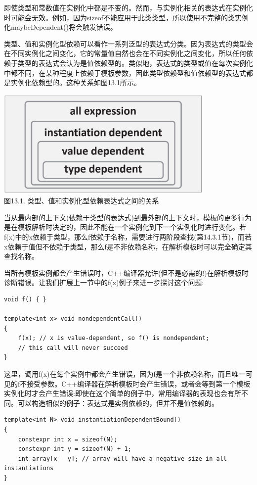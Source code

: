 即使类型和常数值在实例化中都是不变的。然而，与实例化相关的表达式在实例化时可能会无效。例如，因为sizeof不能应用于此类类型，所以使用不完整的类实例化maybeDependent()将会触发错误。

类型、值和实例化型依赖可以看作一系列泛型的表达式分类。因为表达式的类型会在不同实例化之间变化，它的常量值自然也会在不同实例化之间变化，所以任何依赖于类型的表达式会认为是值依赖型的。类似地，表达式的类型或值在每次实例化中都不同，在某种程度上依赖于模板参数，因此类型依赖型和值依赖型的表达式都是实例化依赖型的。这种关系如图13.1所示。

\begin{center}
\includegraphics[width=0.8\textwidth]{content/2/chapter13/images/1.png} \\
图13.1. 类型、值和实例化型依赖表达式之间的关系
\end{center}

当从最内部的上下文(依赖于类型的表达式)到最外部的上下文时，模板的更多行为是在模板解析时决定的，因此不能在一个实例化到下一个实例化时进行变化。若f(x)中的x依赖于类型，那么f依赖于名称，需要进行两阶段查找(第14.3.1节)，而若x依赖于值但不依赖于类型，那么f是不非依赖名称，在解析模板时可以完全确定其查找名称。


当所有模板实例都会产生错误时，C++编译器允许(但不是必需的!)在解析模板时诊断错误。让我们扩展上一节中的f(x)例子来进一步探讨这个问题:

\begin{lstlisting}[style=styleCXX]
void f() { }

template<int x> void nondependentCall()
{
	f(x); // x is value-dependent, so f() is nondependent;
	// this call will never succeed
}
\end{lstlisting}

这里，调用f(x)在每个实例中都会产生错误，因为f是一个非依赖名称，而且唯一可见的f不接受参数。C++编译器在解析模板时会产生错误，或者会等到第一个模板实例化时才会产生错误:即使在这个简单的例子中，常用编译器的表现也会有所不同。可以构造相似的例子：表达式是实例依赖的，但并不是值依赖的。

\begin{lstlisting}[style=styleCXX]
template<int N> void instantiationDependentBound()
{
	constexpr int x = sizeof(N);
	constexpr int y = sizeof(N) + 1;
	int array[x - y]; // array will have a negative size in all instantiations
}
\end{lstlisting}












